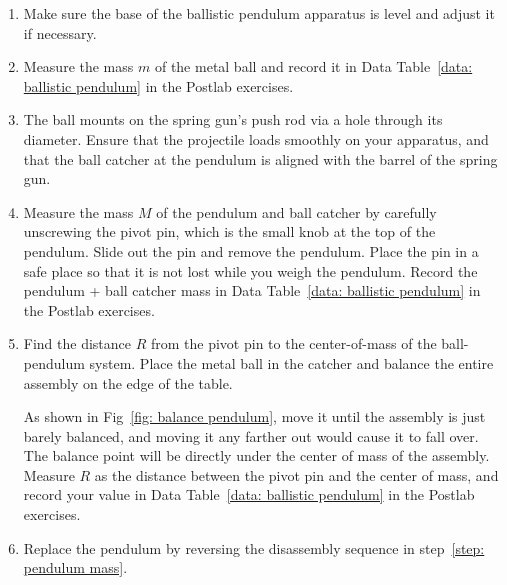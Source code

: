 \documentclass[addpoints]{physlabs}
\begin{document}
\begin{labsection}
\begin{experiment}
    \begin{enumerate}
        \item Make sure the base of the ballistic pendulum apparatus is level and adjust it if necessary.

        \item Measure the mass $m$ of the metal ball and record it in Data Table~\ref{data: ballistic pendulum} in the Postlab exercises.
        
        \item The ball mounts on the spring gun's push rod via a hole through its diameter. Ensure that the projectile loads smoothly on your apparatus, and that the ball catcher at the pendulum is aligned with the barrel of the spring gun.
        
        \item Measure the mass $M$ of the pendulum and ball catcher by carefully unscrewing the pivot pin, which is the small knob at the top of the pendulum. Slide out the pin and remove the pendulum. Place the pin in a safe place so that it is not lost while you weigh the pendulum. Record the pendulum + ball catcher mass in Data Table~\ref{data: ballistic pendulum} in the Postlab exercises. \label{step: pendulum mass}
        
        \item Find the distance $R$ from the pivot pin to the center-of-mass of the ball-pendulum system. Place the metal ball in the catcher and balance the entire assembly on the edge of the table.
        \begin{center}
            
            \captionsetup{font=normalsize}
        \end{center}
        As shown in Fig~\ref{fig: balance pendulum}, move it until the assembly is just barely balanced, and moving it any farther out would cause it to fall over. The balance point will be directly under the center of mass of the assembly. Measure $R$ as the distance between the pivot pin and the center of mass, and record your value in Data Table~\ref{data: ballistic pendulum} in the Postlab exercises.
        
        \item Replace the pendulum by reversing the disassembly sequence in step~\ref{step: pendulum mass}.


\end{enumerate}
\end{experiment}
\end{labsection}
\end{document}
